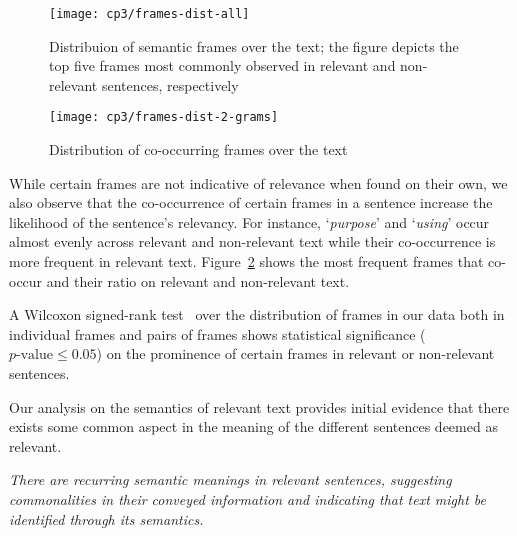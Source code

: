 \begin{figure}
\centering
\texttt{[image: cp3/frames-dist-all]}
\caption{Distribuion of semantic frames over the text; the figure depicts the top five frames most commonly observed in relevant and non-relevant sentences, respectively}
\label{fig:frame-distribution}
\end{figure}


\begin{figure}
\centering
\texttt{[image: cp3/frames-dist-2-grams]}
\caption{Distribution of co-occurring frames over the text}
\label{fig:frame-co-occurrence}
\end{figure}


While certain frames are not indicative of relevance when found on their own, we also observe that the co-occurrence of certain frames in a sentence increase the likelihood of the sentence's relevancy.
For instance, `\textit{purpose}' and `\textit{using}' occur almost evenly across relevant and non-relevant text
while their co-occurrence is more frequent in relevant text. 
Figure~\ref{fig:frame-co-occurrence} shows the most frequent frames that co-occur and their ratio on relevant and non-relevant text.


A Wilcoxon signed-rank test~\cite{wohlin2012} over the distribution of frames in our data both in individual frames and pairs of frames shows statistical significance ($p\text{-value} \le 0.05$) 
on the prominence of certain frames in relevant or non-relevant sentences.







Our analysis on the semantics of relevant text provides initial evidence that there exists some common aspect in the meaning of 
 the different sentences deemed as relevant.






\medskip
\begin{bluequote}
    \textit{There are recurring semantic meanings in relevant sentences,
    suggesting commonalities in their conveyed information
    and indicating that text might be identified through its semantics.}
\end{bluequote}



















    

